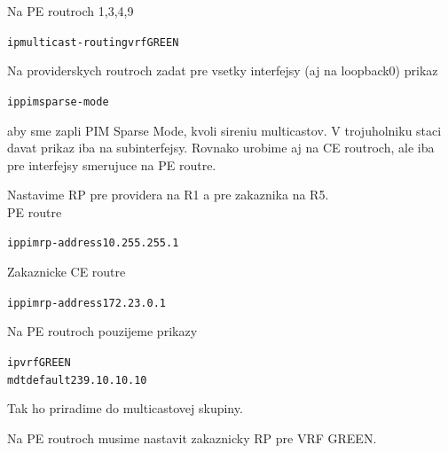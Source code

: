 \documentclass[12pt,twoside,a4paper]{report}
\begin{document}
Na PE routroch 1,3,4,9

\noindent
{\selectfont
\begin{small}
\begin{alltt}
ip multicast-routing vrf GREEN
\end{alltt}
\end{small}
}




Na providerskych routroch zadat pre vsetky interfejsy (aj na loopback0) prikaz

\noindent
{\selectfont
\begin{small}
\begin{alltt}
ip pim sparse-mode
\end{alltt}
\end{small}
}

aby sme zapli PIM Sparse Mode, kvoli sireniu multicastov. V trojuholniku staci davat prikaz iba na subinterfejsy. Rovnako urobime aj na CE routroch, ale iba pre interfejsy smerujuce na PE routre.






Nastavime RP pre providera na R1 a pre zakaznika na R5.\\
PE routre
\noindent
{\selectfont
\begin{small}
\begin{alltt}
ip pim rp-address 10.255.255.1
\end{alltt}
\end{small}
}

Zakaznicke CE routre
\noindent
{\selectfont
\begin{small}
\begin{alltt}
ip pim rp-address 172.23.0.1
\end{alltt}
\end{small}
}



Na PE routroch pouzijeme prikazy

\noindent
{\selectfont
\begin{small}
\begin{alltt}
ip vrf GREEN
  mdt default 239.10.10.10
\end{alltt}
\end{small}
}

Tak ho priradime do multicastovej skupiny.






Na PE routroch musime nastavit zakaznicky RP pre VRF GREEN.
\end{document}
